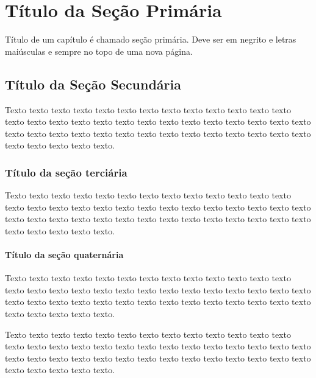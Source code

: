 \chapter{Título da Seção Primária}

Título de um capítulo é chamado seção primária. Deve ser em negrito e letras maiúsculas e sempre no topo de uma nova página.

\section{Título da Seção Secundária}

Texto texto texto texto texto texto texto texto texto texto texto texto texto texto
texto texto texto texto texto texto texto texto texto texto texto texto texto texto texto
texto texto texto texto texto texto texto texto texto texto texto texto texto texto texto
texto texto.

\subsection{Título da seção terciária}

Texto texto texto texto texto texto texto texto texto texto texto texto texto texto
texto texto texto texto texto texto texto texto texto texto texto texto texto texto texto
texto texto texto texto texto texto texto texto texto texto texto texto texto texto texto
texto texto.

\subsubsection{Título da seção quaternária}

Texto texto texto texto texto texto texto texto texto texto texto texto texto texto
texto texto texto texto texto texto texto texto texto texto texto texto texto texto texto
texto texto texto texto texto texto texto texto texto texto texto texto texto texto texto
texto texto.


Texto texto texto texto texto texto texto texto texto texto texto texto texto texto
texto texto texto texto texto texto texto texto texto texto texto texto texto texto texto
texto texto texto texto texto texto texto texto texto texto texto texto texto texto texto
texto texto.